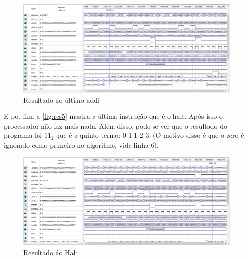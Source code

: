 \documentclass[
	12pt,
	openright,
	a4paper,
	english,			
	french,				
	spanish,			
	brazil,				
	]{abntex2}
\begin{document}
\begin{figure}[H]
\centering 
\caption{Resultado do último addi} \label{fig:res4}
\includegraphics[scale=0.5]{res4.png}
\end{figure}

E por fim, a \autoref{fig:res5} mostra a última instrução que é o halt. Após isso o processador não faz mais nada.
Além disso, pode-se ver que o resultado do programa foi $11_2$ que é o quinto termo: 0 1 1 2 3. (O motivo disso é que o zero é ignorado como primeiro no algoritmo, vide linha 6).

\begin{figure}[H]
\centering 
\caption{Resultado do Halt} \label{fig:res5}
\includegraphics[scale=0.5]{res5.png}
\end{figure}
\end{document}
